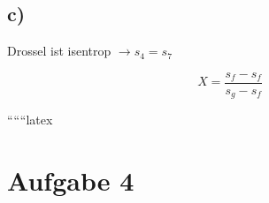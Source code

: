 

\subsection*{c)}

Drossel ist isentrop $\rightarrow s_4 = s_7$

\[
X = \frac{s_f - s_f}{s_g - s_f}
\]

``````latex


\section*{Aufgabe 4}